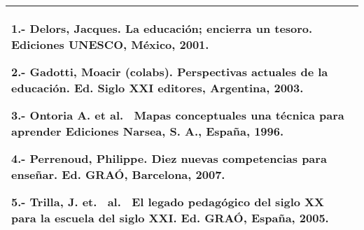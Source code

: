 \begin{tiny}
\begin{center}
\begin{supertabular}{|p{0.85\textwidth}|}
1.- Delors, Jacques. La educación; encierra un tesoro. Ediciones UNESCO, México, 2001.

2.- Gadotti, Moacir (colabs). Perspectivas actuales de la educación. Ed\@. Siglo XXI editores, Argentina, 2003.

3.- Ontoria A. et  al. \ Mapas conceptuales una técnica para aprender Ediciones Narsea, S. A., España, 1996.

4.- Perrenoud, Philippe. Diez nuevas competencias para enseñar. Ed\@. GRAÓ, Barcelona, 2007. 

5.- Trilla, J. et. \ al. \ El legado pedagógico del siglo XX para la escuela del siglo XXI\@. Ed\@. GRAÓ, España, 2005.\\\hline
\end{supertabular}
\end{center}
\end{tiny}


